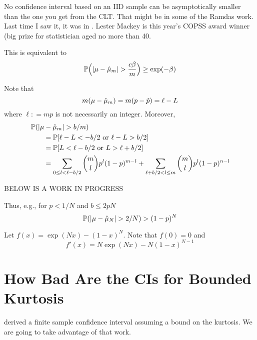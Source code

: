 \documentclass{amsart}
\newcommand{\art}[1]{{\color{blue}#1}}
\begin{document}
\art{No confidence interval based on an IID sample can be asymptotically smaller than the one you get from the CLT.  That might be in some of the Ramdas work. Last time I saw it, it was in \cite{aust:mack:2022-tr}. Lester Mackey is this year's COPSS award winner (big prize for statistician aged no more than 40.}



This is equivalent to
\[
\operatorname{\mathbb{P}}\Bigl(\lvert \mu - \hat{\mu}_m \rvert > \frac{c \beta}{m} \Bigr) \ge \exp(-\beta)
\]

Note that 
\[
m(\mu - \hat{\mu}_m)  = m(p - \hat{p}) = \ell - L
\]
where $\ell : = mp$ is not necessarily an integer.
Moreover, 
\begin{align*}
    \MoveEqLeft \Prob(\lvert \mu - \hmu_m \rvert > b/m) \\
    &= \Prob[ \ell - L < -b/2 \text{ or } \ell - L >  b/2] \\
    &= \Prob[ L < \ell - b/2 \text{ or } L > \ell + b/2] \\
    & = \sum_{0 \le l  < \ell - b/2}  \binom{m}{l} p^{l}(1-p)^{m-l} 
    + \sum_{\ell + b/2 < l \le m}  \binom{m}{l} p^l(1-p)^{n-l}
\end{align*}

\bigskip

BELOW IS A WORK IN PROGRESS


Thus, e.g., for $p < 1/N$ and $b \le 2pN $
\[
\operatorname{\mathbb{P}}(\lvert \mu - \hat{\mu}_N \rvert > 2/N) 
> (1-p)^{N} 
\]

Let $f(x) = \exp(Nx) - (1-x)^N$.  Note that $f(0) =0$ and 
\[
f'(x) = N \exp(Nx) - N(1-x)^{N-1}
\]

\section{How Bad Are the CIs for Bounded Kurtosis}

\cite{HicEtal14a} derived a finite sample confidence interval assuming a bound on the kurtosis.  We are going to take advantage of that work.
\end{document}
